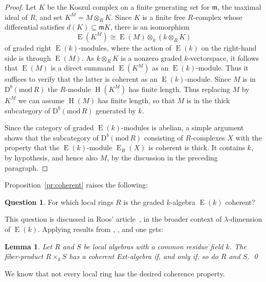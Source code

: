 \documentclass{amsart}
\numberwithin{equation}{section}
\theoremstyle{plain}
\newtheorem{lemma}[equation]{Lemma}
\theoremstyle{definition}
\newtheorem{question}[equation]{Question}
\theoremstyle{remark}
\newcommand{\dbcat}[1]{\mathrm{D}^b(\mathrm{mod}\,{#1})}
\newcommand{\eee}{\operatorname{E}}
\newcommand{\hh}{\operatorname{H}}
\newcommand{\fm}{\mathfrak{m}}
\begin{document}
\begin{proof}
 Let $K$ be the Koszul complex on a finite generating set for $\fm$, the maximal ideal of $R$, and set $K^M=M\otimes_RK$. Since $K$ is a finite free $R$-complex whose differential satisfies $d(K)\subseteq \fm K$, there is an isomorphism 
\[
\eee(K^M)\cong \eee(M)\otimes_k (k\otimes_RK) 
\]
of graded right $\eee(k)$-modules, where the action of $\eee(k)$ on the right-hand side is through $\eee(M)$. As $k\otimes_RK$ is a nonzero graded $k$-vectorspace, it follows that $\eee(M)$ is a direct summand $\eee(K^M)$ as an $\eee(k)$-module. Thus it suffices to verify that the latter is coherent as an $\eee(k)$-module.  Since $M$ is in $\dbcat R$ the $R$-module $\hh(K^M)$ has finite length. Thus replacing $M$ by $K^M$ we can assume $\hh(M)$ has finite length, so that $M$ is in the thick subcategory of $\dbcat R$ generated by $k$.

Since the category of graded $\eee(k)$-modules is abelian, a simple argument shows that the subcategory of $\dbcat R$ consisting of $R$-complexes $X$ with the property that the $\eee(k)$-module $\eee_R(X)$ is coherent is thick.  It contains $k$, by hypothesis, and hence also $M$, by the discussion in the preceding paragraph.
\end{proof}

Proposition~\ref{pr:coherent} raises the following:

\begin{question}
\label{qu:coherence}
 For which local rings $R$ is the graded $k$-algebra $\eee(k)$ coherent?
\end{question}

This question is discussed in Roos' article~\cite{Roos:1982b}, in the broader context of $\lambda$-dimension of $\eee(k)$.  Applying results from \cite{Moore:2009a},  \cite{Ananthnarayan/Avramov/Moore:2012}, and \cite{Choo/Lam/Luft:1973} one gets:

\begin{lemma}
Let $R$ and $S$ be local algebras with a common residue field $k$. The fiber-product $R\times_kS$ has a coherent Ext-algebra if, and only if, so do $R$ and $S$. \qed
\end{lemma}

We know that not every local ring has the desired coherence property. 
\end{document}
